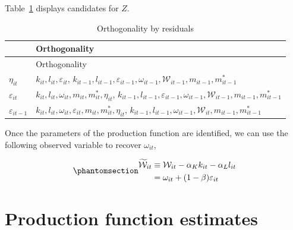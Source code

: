 \documentclass[
  12pt,
  letterpaper,
  oneside,
  openany]{report}
\begin{document}
Table~\ref{tbl-orth} displays candidates for \(Z\).

\begin{longtable}[]{@{}
  >{\raggedright\arraybackslash}p{}
  >{\centering\arraybackslash}p{}@{}}
\caption{Orthogonality by residuals}\label{tbl-orth}\tabularnewline
\toprule\noalign{}
\begin{minipage}[b]{\linewidth}\raggedright
\end{minipage} & \begin{minipage}[b]{\linewidth}\centering
Orthogonality
\end{minipage} \\
\midrule\noalign{}
\endfirsthead
\toprule\noalign{}
\begin{minipage}[b]{\linewidth}\raggedright
\end{minipage} & \begin{minipage}[b]{\linewidth}\centering
Orthogonality
\end{minipage} \\
\midrule\noalign{}
\endhead
\bottomrule\noalign{}
\endlastfoot
\(\eta_{it}\) & \(k_{it},l_{it},\varepsilon_{it}\),
\(k_{it-1},l_{it-1},\varepsilon_{it-1},\omega_{it-1},\mathcal{W}_{it-1},m_{it-1},m^*_{it-1}\) \\
\(\varepsilon_{it}\) &
\(k_{it},l_{it},\omega_{it},m_{it},m^*_{it},\eta_{it}\),
\(k_{it-1},l_{it-1},\varepsilon_{it-1},\omega_{it-1},\mathcal{W}_{it-1},m_{it-1},m^*_{it-1}\) \\
\(\varepsilon_{it-1}\) &
\(k_{it},l_{it},\omega_{it},\varepsilon_{it},m_{it},m^*_{it},\eta_{it}\),
\(k_{it-1},l_{it-1},\omega_{it-1},\mathcal{W}_{it},m_{it-1},m^*_{it-1}\) \\
\end{longtable}

Once the parameters of the production function are identified, we can
use the following observed variable to recover \(\omega_{it}\),

\begin{equation}\protect\phantomsection\label{eq-w-squiggle}{
\begin{aligned}
    \widetilde{\mathcal W}_{it} & \equiv \mathcal W_{it} - \alpha_K k_{it}-\alpha_L l_{it}\\
    & = \omega_{it}+(1-\beta)\varepsilon_{it}
\end{aligned}
}\end{equation}

\section{Production function estimates}\label{sec-pf-estimates}
\end{document}

